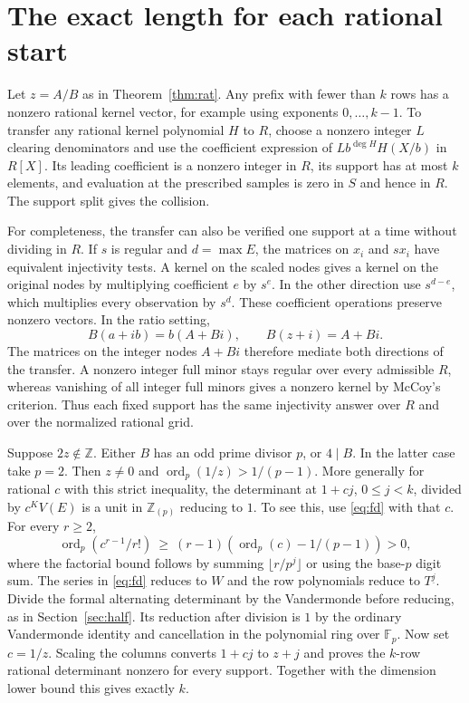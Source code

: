 \documentclass[10pt]{article}
\newcommand{\Z}{\mathbb Z}
\newcommand{\Fp}{\mathbb F}
\newcommand{\ord}{\operatorname{ord}}
\begin{document}
\section{The exact length for each rational start}\label{sec:rationals}
Let $z=A/B$ as in Theorem~\ref{thm:rat}. Any prefix with fewer than
$k$ rows has a nonzero rational kernel vector, for example using
exponents $0,\ldots,k-1$. To transfer any rational kernel polynomial
$H$ to $R$, choose a nonzero integer $L$ clearing denominators and
use the coefficient expression of $L b^{\deg H} H(X/b)$ in $R[X]$.
Its leading coefficient is a nonzero integer in $R$, its support
has at most $k$ elements, and evaluation at the prescribed samples is
zero in $S$ and hence in $R$. The support split gives the collision.

For completeness, the transfer can also be verified one support at a
time without dividing in $R$. If $s$ is regular and $d=\max E$, the
matrices on $x_i$ and $s x_i$ have equivalent injectivity tests. A kernel
on the scaled nodes gives a kernel on the original nodes by multiplying
coefficient $e$ by $s^e$. In the other direction use $s^{d-e}$, which
multiplies every observation by $s^d$. These coefficient operations
preserve nonzero vectors. In the ratio setting,
\[
 B(a+ib)=b(A+Bi),\qquad B(z+i)=A+Bi.
\]
The matrices on the integer nodes $A+Bi$ therefore mediate both
directions of the transfer. A nonzero integer full minor stays regular
over every admissible $R$, whereas vanishing of all integer full minors
gives a nonzero kernel by McCoy's criterion. Thus each fixed support has
the same injectivity answer over $R$ and over the normalized rational
grid.

Suppose $2z\notin\Z$. Either $B$ has an odd prime divisor $p$, or
$4\mid B$. In the latter case take $p=2$. Then $z\ne0$ and
$\ord_p(1/z)>1/(p-1)$. More generally for rational $c$ with this
strict inequality, the determinant at $1+cj$, $0\le j<k$, divided
by $c^K V(E)$ is a unit in $\Z_{(p)}$ reducing to $1$.
To see this, use \eqref{eq:fd} with that $c$. For every $r\ge2$,
\[
 \ord_p(c^{r-1}/r!)\ \ge\
 (r-1)(\ord_p(c)-1/(p-1))>0,
\]
where the factorial bound follows by summing $\lfloor r/p^j\rfloor$
or using the base-$p$ digit sum. The series in \eqref{eq:fd}
reduces to $W$ and the row polynomials reduce to $T^{\underline j}$.
Divide the formal alternating determinant by the Vandermonde
before reducing, as in Section~\ref{sec:half}. Its reduction after
division is $1$ by the ordinary Vandermonde identity and cancellation
in the polynomial ring over $\Fp_p$. Now set $c=1/z$.
Scaling the columns converts $1+cj$ to $z+j$ and proves the
$k$-row rational determinant nonzero for every support.
Together with the dimension lower bound this gives exactly $k$.
\end{document}
